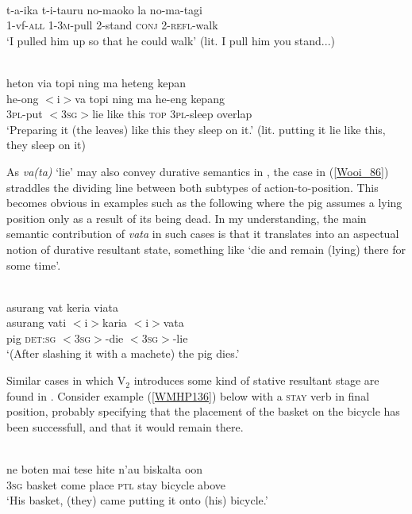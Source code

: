 \ea \label{Tobelo_20}
\\
\gll t-a-ika t-i-tauru no-maoko la no-ma-tagi \\
1-vf-\textsc{all} 1-3\textsc{m}-pull 2-stand \textsc{conj} 2-\textsc{refl}-walk \\
\glft `I pulled him up so that he could walk' (lit. I pull him you stand...)\\ 
\z

\ea \label{Wooi_86}
\\
\glll heton via topi ning ma heteng kepan \\
he-ong $<$i$>$va topi ning ma he-eng kepang \\
3\textsc{pl}-put $<$3\textsc{sg}$>$lie like this \textsc{top} 3\textsc{pl}-sleep overlap \\
\glft `Preparing it (the leaves) like this they sleep on it.' (lit. putting it lie like this, they sleep on it) \\ 
\z

As \textit{va(ta)} `lie' may also convey durative semantics in , the  case in (\ref{Wooi_86}) straddles the dividing line between both subtypes of action-to-position. This becomes obvious in examples such as the following where the pig assumes a lying position only as a result of its being dead. In my understanding, the main semantic contribution of \textit{vata} in such cases is that it translates into an aspectual notion of durative resultant state, something like `die and remain (lying) there for some time'.

\ea 
{}\\
\glll asurang vat keria viata \\
asurang vati $<$i$>$karia $<$i$>$vata \\
pig \textsc{det}:\textsc{sg} $<$3\textsc{sg}$>$-die $<$3\textsc{sg}$>$-lie \\
\glft `(After slashing it with a machete) the pig dies.'\\ 
\z

Similar cases in which V$_2$ introduces some kind of stative resultant stage are found in . Consider example (\ref{WMHP136}) below with a \textsc{stay} verb in final position, probably specifying that the placement of the basket on the bicycle has been successfull, and that it would remain there.

\ea \label{WMHP136}
\\
\gll ne boten mai tese hite n'au biskalta oon \\
\textsc{3}\textsc{sg} basket come place \textsc{ptl} stay bicycle above \\
\glft `His basket, (they) came putting it onto (his) bicycle.' \\ 
\z

